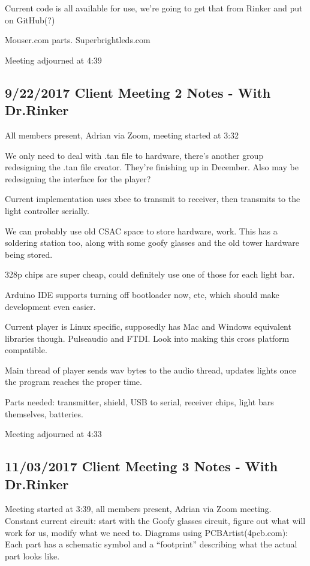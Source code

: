 \documentclass[12pt]{article}
\begin{document}
Current code is all available for use, we're going to get that from Rinker and put on GitHub(?)

Mouser.com parts. Superbrightleds.com	

Meeting adjourned at 4:39

	\clearpage
	\subsection{9/22/2017 Client Meeting 2 Notes - With Dr.Rinker}
	All members present, Adrian via Zoom, meeting started at 3:32

We only need to deal with .tan file to hardware, there’s another group redesigning the .tan file creator. They’re finishing up in December. Also may be redesigning the interface for the player?

Current implementation uses xbee to transmit to receiver, then transmits to the light controller serially. 

We can probably use old CSAC space to store hardware, work. This has a soldering station too, along with some goofy glasses and the old tower hardware being stored. 

328p chips are super cheap, could definitely use one of those for each light bar. 

Arduino IDE supports turning off bootloader now, etc, which should make development even easier. 

Current player is Linux specific, supposedly has Mac and Windows equivalent libraries though. Pulseaudio and FTDI. Look into making this cross platform compatible.

Main thread of player sends wav bytes to the audio thread, updates lights once the program reaches the proper time. 

Parts needed: transmitter, shield, USB to serial, receiver chips, light bars themselves, batteries. 

Meeting adjourned at 4:33

	\clearpage
	\subsection{11/03/2017 Client Meeting 3 Notes - With Dr.Rinker}
	
	\noindent
	Meeting started at 3:39, all members present, Adrian via Zoom meeting.\\
	
	\noindent
	Constant current circuit: start with the Goofy glasses circuit, figure out what will work for us, 			modify what we need to. Diagrams using PCBArtist(4pcb.com): Each part has a schematic symbol and a 			“footprint” describing what the actual part looks like.\\
\end{document}
